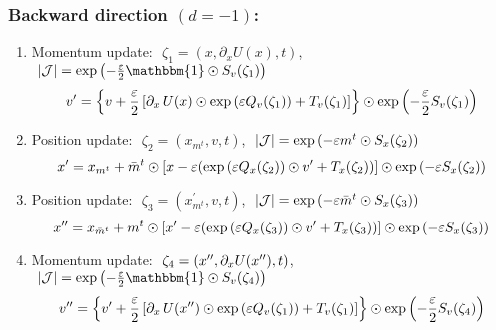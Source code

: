 \documentclass[../main.tex]{subfiles}
\begin{document}
\subsubsection{Backward direction \texorpdfstring{$(d = -1)$}{(d = -1)}:}%
\label{subsubsec:augmented_leapfrog_equations_backward}
%
\begin{enumerate}
  \item Momentum update: $\,\,\zeta_{1} = (x, \partial_{x} U(x), t)$,
    $\,\, |\mathcal{J}| = \exp{\left(-\frac{\eps}{2}\mathbbm{1}\odot S_{v}(\zeta_1)\right)}$
    \vspace{-20pt}
    \begin{equation}
      v^{\prime} = {\left\{v + \frac{\eps}{2}\left[\partial_{x}\,U(x)\odot \exp{\left(\eps Q_{v}(\zeta_{1})\right)}%
            + T_{v}(\zeta_{1})\right]\right\}} \odot \exp{\left(-\frac{\eps}{2}S_{v}(\zeta_{1})\right)}
    \end{equation}
    \vspace{-50pt}
  \item Position update: $\,\,\zeta_{2} = (x_{m^{t}}, v, t)$,
    $\,\, |\mathcal{J}| = \exp{\left(-{\varepsilon}m^{t}\odot S_{x}(\zeta_2)\right)}$
    \vspace{-20pt}
    \begin{equation}
      \xp = x_{m^{t}} + \bar{m}^{t}\odot%
        {\left[x - \eps{\left(\exp{\left(\eps Q_{x}(\zeta_{2})\right)}\odot \vp%
                + T_{x}(\zeta_{2})\right)}\right]}\odot \exp{\left(-\eps S_{x}(\zeta_{2})\right)}
    \end{equation}
    \vspace{-50pt}
  \item Position update: $\,\,\zeta_{3} = (x^{\prime}_{m^{t}}, v, t)$,
    $\,\, |\mathcal{J}| = \exp{\left(-{\varepsilon}\bar{m}^{t}\odot S_{x}(\zeta_3)\right)}$
    \vspace{-20pt}
    \begin{equation}
      \xpp = x_{\bar{m}^{t}} + m^{t}\odot%
        {\left[\xp - \eps{\left(\exp{\left(\eps Q_{x}(\zeta_{3})\right)}\odot \vp%
                + T_{x}(\zeta_{3})\right)}\right]}\odot \exp{\left(-\eps S_{x}(\zeta_{3})\right)}
    \end{equation}
    \vspace{-50pt}
  \item Momentum update: $\,\,\zeta_{4} = ({x^{\prime\prime}}, \partial_{x} U({x^{\prime\prime}}), t)$,
    $\,\, |\mathcal{J}| = \exp{\left(-\frac{\eps}{2}\mathbbm{1}\odot S_{v}(\zeta_4)\right)}$
    \vspace{-20pt}
    \begin{equation}
      v^{\prime\prime} = {\left\{\vp + \frac{\eps}{2}\left[\partial_{x}\,U(\xpp)\odot%
            \exp{\left(\eps Q_{v}(\zeta_{1})\right)}
            + T_{v}(\zeta_{1})\right]\right\}}\odot 
            \exp{\left(-\frac{\eps}{2}S_{v}(\zeta_{4})\right)}
    \end{equation}
\end{enumerate}
%
\end{document}

